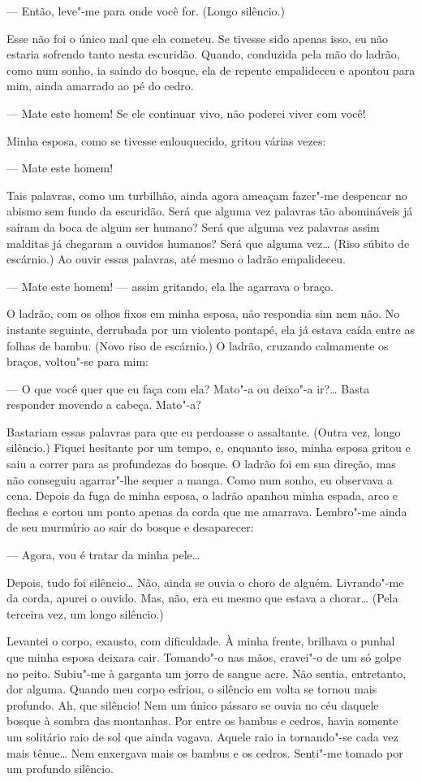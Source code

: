 --- Então, leve"-me para onde você for. (Longo silêncio.)

Esse não foi o único mal que ela cometeu. Se tivesse sido apenas isso,
eu não estaria sofrendo tanto nesta escuridão. Quando, conduzida pela
mão do ladrão, como num sonho, ia saindo do bosque, ela de repente
empalideceu e apontou para mim, ainda amarrado ao pé do cedro.

--- Mate este homem! Se ele continuar vivo, não poderei viver com você!

Minha esposa, como se tivesse enlouquecido, gritou várias vezes:

--- Mate este homem!

Tais palavras, como um turbilhão, ainda agora ameaçam fazer"-me despencar
no abismo sem fundo da escuridão. Será que alguma vez palavras tão
abomináveis já saíram da boca de algum ser humano? Será que alguma vez
palavras assim malditas já chegaram a ouvidos humanos? Será que alguma
vez\ldots{} (Riso súbito de escárnio.) Ao ouvir essas palavras, até mesmo o
ladrão empalideceu.

--- Mate este homem! --- assim gritando, ela lhe agarrava o braço.

O ladrão, com os olhos fixos em minha esposa, não respondia sim nem não.
No instante seguinte, derrubada por um violento pontapé, ela já estava
caída entre as folhas de bambu. (Novo riso de escárnio.) O ladrão,
cruzando calmamente os braços, voltou"-se para mim:

--- O que você quer que eu faça com ela? Mato"-a ou deixo"-a ir?\ldots{} Basta
responder movendo a cabeça. Mato"-a?

Bastariam essas palavras para que eu perdoasse o assaltante. (Outra vez,
longo silêncio.) Fiquei hesitante por um tempo, e, enquanto isso, minha
esposa gritou e saiu a correr para as profundezas do bosque. O ladrão
foi em sua direção, mas não conseguiu agarrar"-lhe sequer a manga. Como
num sonho, eu observava a cena. Depois da fuga de minha esposa, o
ladrão apanhou minha espada, arco e flechas e cortou um ponto apenas da
corda que me amarrava. Lembro"-me ainda de seu murmúrio ao sair do
bosque e desaparecer:

--- Agora, vou é tratar da minha pele\ldots{}

Depois, tudo foi silêncio\ldots{} Não, ainda se ouvia o choro de alguém.
Livrando"-me da corda, apurei o ouvido. Mas, não, era eu mesmo que
estava a chorar\ldots{} (Pela terceira vez, um longo silêncio.)

Levantei o corpo, exausto, com dificuldade. À minha frente, brilhava o
punhal que minha esposa deixara cair. Tomando"-o nas mãos, cravei"-o de
um só golpe no peito. Subiu"-me à garganta um jorro de sangue acre. Não
sentia, entretanto, dor alguma. Quando meu corpo esfriou, o silêncio em
volta se tornou mais profundo. Ah, que silêncio! Nem um único pássaro
se ouvia no céu daquele bosque à sombra das montanhas. Por entre os
bambus e cedros, havia somente um solitário raio de sol que ainda
vagava. Aquele raio ia tornando"-se cada vez mais tênue\ldots{} Nem enxergava
mais os bambus e os cedros. Senti"-me tomado por um profundo silêncio.


